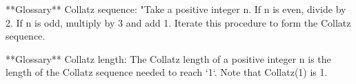 







**Glossary** Collatz sequence: "Take a positive integer n. If n is even, divide by 2. If n is odd, multiply by 3 and add 1. Iterate this procedure to form the Collatz sequence. 

**Glossary** Collatz length: The Collatz length of a positive integer n is the length of the  Collatz sequence needed to reach `1`.  Note that Collatz(1) is 1.
